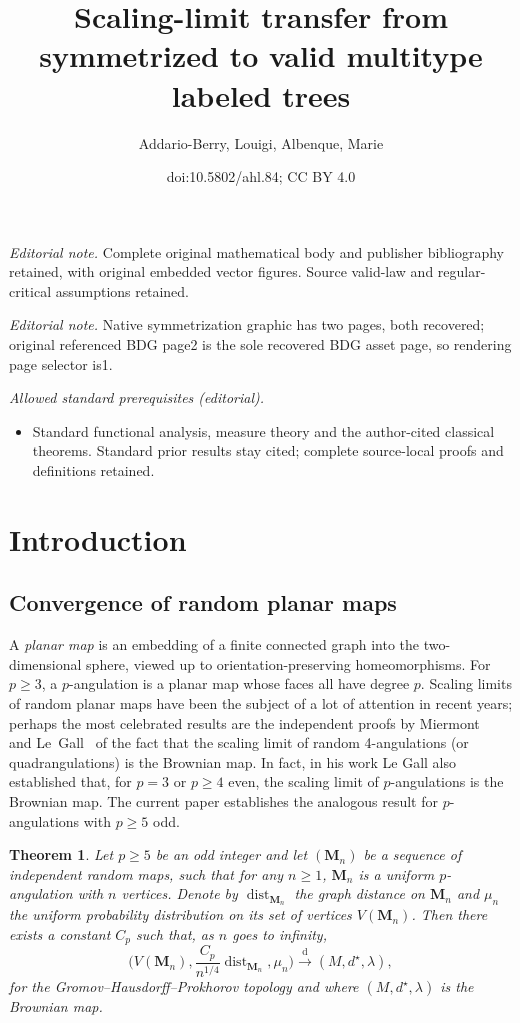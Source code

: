 \documentclass[10pt]{amsart}
\title{Scaling-limit transfer from symmetrized to valid multitype labeled trees}
\author{Addario-Berry, Louigi, Albenque, Marie}
\date{doi:10.5802/ahl.84; CC BY 4.0}
\newtheorem{theo}{Theorem}[section]
\theoremstyle{definition}\newtheorem{defi}[theo]{Definition}\newtheorem{rema}[theo]{Remark}\newtheorem{exam}[theo]{Example}\newtheorem{exem}[theo]{Example}\newtheorem{nota}[theo]{Notation}
\newcommand{\bM}{\mathbf{M}}
\DeclareMathOperator{\dist}{dist}
\newcommand{\convdist}{\ensuremath{\stackrel{\mathrm{d}}{\rightarrow}}}
\begin{document}
\maketitle
\noindent\textit{Editorial note.} Complete original mathematical body and publisher bibliography retained, with original embedded vector figures. Source valid-law and regular-critical assumptions retained.\par\medskip
\noindent\textit{Editorial note.} Native symmetrization graphic has two pages, both recovered; original referenced BDG page2 is the sole recovered BDG asset page, so rendering page selector is1.\par\medskip
\noindent\textit{Allowed standard prerequisites (editorial).}\begin{itemize}
\item Standard functional analysis, measure theory and the author-cited classical theorems. Standard prior results stay cited; complete source-local proofs and definitions retained.
\end{itemize}\medskip


\section{Introduction}\label{sec:introduction}

\subsection{Convergence of random planar maps}
A \emph{planar map} is an embedding of a finite connected graph into the two-dimensional sphere, viewed up to orientation-preserving homeomorphisms. For $p\geq 3$, a \linebreak$p$-angulation is a planar map whose faces all have degree $p$. Scaling limits of random planar maps have been the subject of a lot of attention in recent years; perhaps the most celebrated results are the independent proofs by Miermont~\cite{MiermontBrownian} and Le~Gall~\cite{LeGallUniqueness} of the fact that the scaling limit of random 4-angulations (or quadrangulations) is the Brownian map. In fact, in his work Le Gall also established that, for $p=3$ or $p\ge 4$ even, the scaling limit of $p$-angulations is the Brownian map. The current paper establishes the analogous result for $p$-angulations with $p\ge 5$ odd.

\begin{theo}\label{th:oddAngulations}
Let $p\geq 5$ be an \emph{odd} integer and let $(\bM_n)$ be a sequence of independent random maps, such that for any $n\geq 1$, $\bM_n$ is a uniform $p$-angulation with $n$ vertices. Denote by $\dist_{\bM_n}$ the graph distance on $\bM_n$ and $\mu_n$ the uniform probability distribution on its set of vertices $V(\bM_n)$. Then there exists a constant $C_p$ such that, as $n$ goes to infinity,
\[
\Big(V(\bM_n),\frac{C_p}{n^{1/4}}\dist_{\bM_n},\mu_n\Big) \convdist (M,d^\star,\lambda),
\]
for the Gromov--Hausdorff--Prokhorov topology and where $(M,d^\star,\lambda)$ is the Brownian map.
\end{theo}
\end{document}
